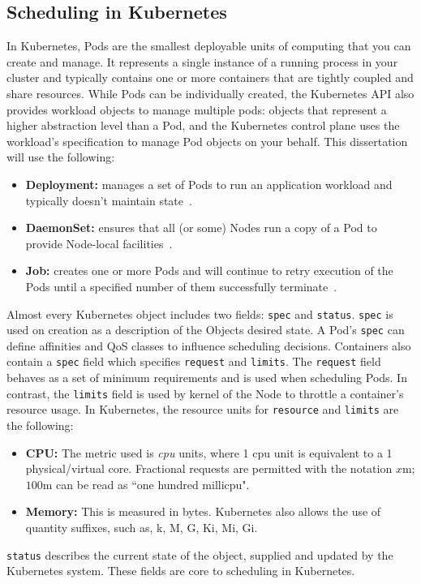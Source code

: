 \subsection{Scheduling in Kubernetes}
In Kubernetes, Pods are the smallest deployable units of computing that you can
create and manage. It represents a single instance of a running
process in your cluster and typically contains one or more containers that are
tightly coupled and share resources. While Pods can be individually created,
the Kubernetes API also provides workload objects to manage multiple pods:
objects that represent a higher abstraction level than a Pod, and the Kubernetes
control plane uses the workload's specification to manage Pod objects on your
behalf. This dissertation will use the following:
\begin{itemize}
    \item \textbf{Deployment:} manages a set of Pods to run an application
        workload and typically doesn't maintain state~\cite{kube_deployments}.
    \item \textbf{DaemonSet:} ensures that all (or some) Nodes run a copy of a
        Pod to provide Node-local facilities~\cite{kube_daemonset}.
    \item \textbf{Job:} creates one or more Pods and will continue to retry
        execution of the Pods until a specified number of them successfully
        terminate~\cite{kube_jobs}.
\end{itemize}

Almost every Kubernetes object includes two fields: \verb|spec| and
\verb|status|. \verb|spec| is used on creation as a description of the Objects
desired state. A Pod's \texttt{spec} can define affinities and QoS classes to
influence scheduling decisions. Containers also contain a \verb|spec| field
which specifies \verb|request| and \verb|limits|. The \texttt{request} field
behaves as a set of minimum requirements and is used when scheduling Pods. In
contrast, the \texttt{limits} field is used by kernel of the Node to throttle a
container's resource usage. In Kubernetes, the resource units for
\texttt{resource} and \texttt{limits} are the following:
\begin{itemize}
    \item \textbf{CPU:} The metric used is \textit{cpu} units, where 1 cpu unit
        is equivalent to a 1 physical/virtual core. Fractional requests are
        permitted with the notation $x$m; $100$m can be read as ``one hundred
        millicpu".
    \item \textbf{Memory:} This is measured in bytes. Kubernetes also allows the
        use of quantity suffixes, such as, k, M, G, Ki, Mi, Gi.
\end{itemize}
\texttt{status} describes the current state of the object, supplied and updated
by the Kubernetes system. These fields are core to scheduling in Kubernetes.

